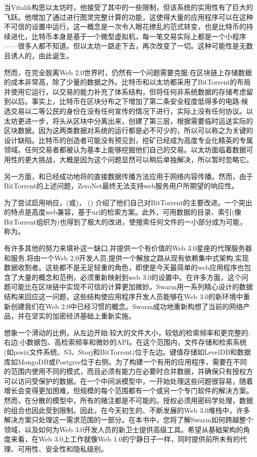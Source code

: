 当Vitalik构思以太坊时，他接受了其中的一些限制，但该系统的实用性有了巨大的飞跃。他增加了通过进行图灵完整计算的功能，这使得大量的应用程序可以在这种不可信的设置中运行。这一概念是一次令人眼花缭乱的范式转变，也是比特币的持续进化，比特币本身是基于一个微型虚拟机，每一笔交易实际上都是一个小程序——很多人都不知道。但以太坊一路走下去，再次改变了一切。这种可能性是无数且诱人的，由此诞生。

然而，在完全脱离Web 2.0世界时，仍然有一个问题需要克服:在区块链上存储数据的成本非常高，除了少量的数据之外。比特币和以太坊都采用了BitTorrent的布局并使用它运行，以交易的能力补充了体系结构，但将任何非系统数据的存储考虑留到以后。事实上，比特币在区块分布之下增加了第二条安全程度低得多的电路:候选交易以二等公民的身份在没有任何宣传的情况下进行，实际上没有任何协议。以太坊更进一步，将头从区块中分离出来，创建了第三层，根据需要临时运送实际的区块数据。因为这两类数据对系统的运行都是必不可少的，所以可以称之为关键的设计缺陷。比特币的创造者可能没有预见到，挖矿已经成为高度专业化精英的专属领域。任何交易者都被认为基本上能够挖掘他们自己的交易。以太坊面临着数据可用性的更大挑战，大概是因为这个问题显然可以稍后单独解决，所以暂时忽略它。 

另一方面，和\cite{zeronet}已经成功地将的直接数据传播方法应用于网络内容传播。然而，由于BitTorrent的上述问题，ZeroNet最终无法支持web服务用户所期望的响应性。

为了尝试启用响应，(或)，  () \cite{ipfs2014}介绍了他们自己对BitTorrent的主要改进。一个突出的特点是高度web兼容，基于url的检索方案。此外，可用数据的目录、索引(像BitTorrent组织为)也得到了极大的改进，使搜索任何文件的一小部分成为可能，称为。

有许多其他的努力来填补这一缺口,并提供一个有价值的Web 3.0星座的代理服务器和服务,将由一个Web 2.0开发人员,提供一个解放之路从现有依赖集中式架构,实现数据收割者。这些都不是无足轻重的角色，即使是今天最简单的web应用程序也包含了大量的概念和范例，必须重新映射到web 3.0的设置中。在许多方面，这个问题可能比在区块链中实现不可信的计算更加微妙。Swarm用一系列精心设计的数据结构来回应这一问题，这些结构使应用程序开发人员能够在Web 3.0的新环境中重新创建我们在Web 2.0中已经习惯的概念。Swarm成功地重新构想了当前的网络产品，并在坚实的加密经济基础上重新实施。

想象一个滑动的比例，从左边开始:较大的文件大小，较低的检索频率和更完整的;右边:小数据包、高检索频率和微妙的API。在这个范围内，文件存储和检索系统(如posix文件系统、S3、Storj和BitTorrent)位于左边。键值存储如LevelDB和数据库如MongoDB或Postgres位于右侧。为了构建一个有用的应用程序，需要在不同的范围内使用不同的模式，而且必须有能力在必要时合并数据，并确保只有授权方可以访问受保护的数据。在一个中间派模型中，一开始处理这些问题很容易，随着增长会变得更加困难，但规模的每个范围都有一个或另一个专门软件的解决方案。然而，在分散的模型中，所有的赌注都是不可能的。授权必须用密码学处理，数据的组合也因此受到限制。因此，在今天初生的、不断发展的Web 3.0堆栈中，许多解决方案只处理这一需求范围的一部分。在本书中，您将了解Swarm如何跨越整个领域，以及如何为Web 3.0开发人员的新卫士提供高级工具。希望从基础架构的角度来看，在Web 3.0上工作就像Web 1.0的宁静日子一样，同时提供前所未有的代理、可用性、安全性和隐私级别。

